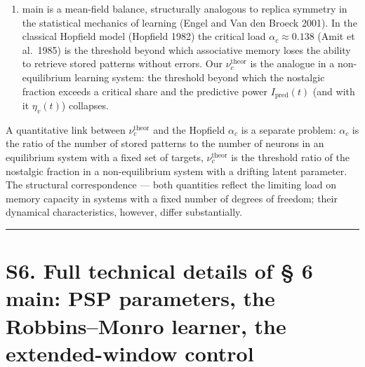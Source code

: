 \documentclass[pdflatex,sn-mathphys-ay]{sn-jnl}
\providecommand{\tightlist}{\setlength{\itemsep}{0pt}\setlength{\parskip}{0pt}}
\begin{document}
\begin{enumerate}

\def\labelenumi{(\arabic{enumi})}

\setcounter{enumi}{10}

\tightlist

\item

  main is a mean-field balance, structurally analogous to replica symmetry in the statistical mechanics of learning (Engel and Van den Broeck 2001). In the classical Hopfield model (Hopfield 1982) the critical load \(\alpha_c \approx 0.138\) (Amit et al.~1985) is the threshold beyond which associative memory loses the ability to retrieve stored patterns without errors. Our \(\nu_c^{\text{theor}}\) is the analogue in a non-equilibrium learning system: the threshold beyond which the nostalgic fraction exceeds a critical share and the predictive power \(I_{\text{pred}}(t)\) (and with it \(\eta_v(t)\)) collapses.

\end{enumerate}



A quantitative link between \(\nu_c^{\text{theor}}\) and the Hopfield \(\alpha_c\) is a separate problem: \(\alpha_c\) is the ratio of the number of stored patterns to the number of neurons in an equilibrium system with a fixed set of targets, \(\nu_c^{\text{theor}}\) is the threshold ratio of the nostalgic fraction in a non-equilibrium system with a drifting latent parameter. The structural correspondence --- both quantities reflect the limiting load on memory capacity in systems with a fixed number of degrees of freedom; their dynamical characteristics, however, differ substantially.



\begin{center}\rule{0.5\linewidth}{0.5pt}\end{center}



\section*{S6. Full technical details of § 6 main: PSP parameters, the Robbins--Monro learner, the extended-window control}\label{s6.-full-technical-details-of-6-main-psp-parameters-the-robbinsmonro-learner-the-extended-window-control}
\end{document}
